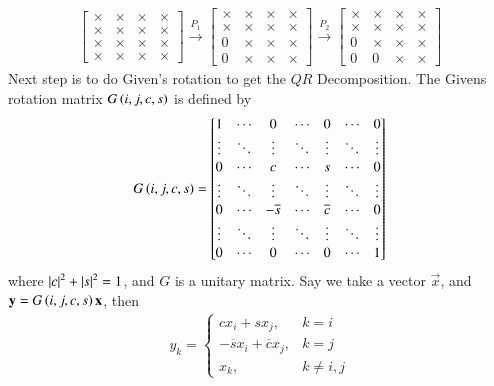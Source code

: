 \documentclass[journal]{IEEEtran}
\numberwithin{equation}{enumi}
\numberwithin{figure}{enumi}
\begin{document}
\begin{align}
	\begin{bmatrix}
		\times & \times & \times & \times \\
		\times & \times & \times & \times \\
		\times & \times & \times & \times \\
		\times & \times & \times & \times
	\end{bmatrix}
	\xrightarrow{P_1}
	\begin{bmatrix}
		\times & \times & \times & \times \\
		\times & \times & \times & \times \\
		0 & \times & \times & \times \\
		0 & \times & \times & \times
	\end{bmatrix}
	\xrightarrow{P_2}
	\begin{bmatrix}
		\times & \times & \times & \times \\
		\times & \times & \times & \times \\
		0 & \times & \times & \times \\
		0 & 0 & \times & \times
	\end{bmatrix}
\end{align}
Next step is to do Given's rotation to get the $QR$ Decomposition.
\newline
The Givens rotation matrix $G\left(i, j, c, s\right)$ is defined by
\begin{align}
	G\left(i, j, c, s\right) = 
	\begin{bmatrix}
		1 & \cdots & 0 & \cdots & 0 & \cdots & 0 \\
		\vdots & \ddots & \vdots & \ddots & \vdots & \ddots & \vdots \\
		0 & \cdots & c & \cdots & s & \cdots & 0 \\
		\vdots & \ddots & \vdots & \ddots & \vdots & \ddots & \vdots \\
		0 & \cdots & -\overline{s} & \cdots & \overline{c} & \cdots & 0 \\
		\vdots & \ddots & \vdots & \ddots & \vdots & \ddots & \vdots \\
		0 & \cdots & 0 & \cdots & 0 & \cdots & 1
	\end{bmatrix}
\end{align}
where $\left\vert c\right\vert^2 + \left\vert s\right\vert^2 = 1$, and $G$ is a unitary matrix.
\newline
Say we take a vector $\vec{x}$, and $\mathbf{y} = G\left(i, j, c, s\right)\mathbf{x}$, then
\begin{align}
	y_k = \begin{cases}
		c x_i + s x_j, & k = i \\
		-\overline{s} x_i + \overline{c} x_j, & k = j \\
		x_k, & k \neq i, j
	\end{cases}
\end{align}
\end{document}
